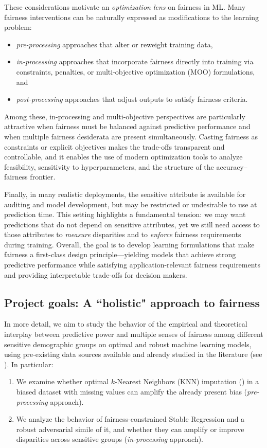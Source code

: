 \documentclass{article}
\begin{document}
These considerations motivate an \emph{optimization lens} on fairness in ML. Many fairness interventions can be naturally expressed as modifications to the learning problem:
\begin{itemize}
    \item[(i)] \emph{pre-processing} approaches that alter or reweight training data,
    \item[(ii)] \emph{in-processing} approaches that incorporate fairness directly into training via constraints, penalties, or multi-objective optimization (MOO) formulations, and
    \item[(iii)] \emph{post-processing} approaches that adjust outputs to satisfy fairness criteria.
\end{itemize}
Among these, in-processing and multi-objective perspectives are particularly attractive when fairness must be balanced against predictive performance and when multiple fairness desiderata are present simultaneously. Casting fairness as constraints or explicit objectives makes the trade-offs transparent and controllable, and it enables the use of modern optimization tools to analyze feasibility, sensitivity to hyperparameters, and the structure of the accuracy--fairness frontier.

Finally, in many realistic deployments, the sensitive attribute is available for auditing and model development, but may be restricted or undesirable to use at prediction time. This setting highlights a fundamental tension: we may want predictions that do not depend on sensitive attributes, yet we still need access to those attributes to \emph{measure} disparities and to \emph{enforce} fairness requirements during training. Overall, the goal is to develop learning formulations that make fairness a first-class design principle---yielding models that achieve strong predictive performance while satisfying application-relevant fairness requirements and providing interpretable trade-offs for decision makers.

\subsection{Project goals: A ``holistic" approach to fairness}

In more detail, we aim to study the behavior of the empirical and theoretical interplay between predictive power and multiple senses of fairness among different sensitive demographic groups on optimal and robust machine learning models, using pre-existing data sources available and already studied in the literature (see \cite{Martinez2022}). In particular:
\begin{enumerate}
    \item We examine whether optimal $ k$-Nearest Neighbors (KNN) imputation (\cite{JMLR:v18:17-073}) in a biased dataset with missing values can amplify the already present bias (\textit{pre-processing} approach).
    \item We analyze the behavior of fairness-constrained Stable Regression and a robust adversarial simile of it, and whether they can amplify or improve disparities across sensitive groups (\textit{in-processing} approach).
\end{enumerate}
\end{document}
